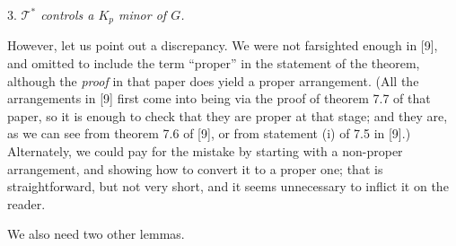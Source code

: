 \hspace*{12pt}3. \textit{$\mathcal{T}^*$ controls a $K_p$ minor of $G$.}

However, let us point out a discrepancy. We were not farsighted enough in [9], and omitted to include the term ``proper'' in the statement of the theorem, although the \textit{proof} in that paper does yield a proper arrangement. (All the arrangements in [9] first come into being via the proof of theorem 7.7 of that paper, so it is enough to check that they are proper at that stage; and they are, as we can see from theorem 7.6 of [9], or from statement (i) of 7.5 in [9].) Alternately, we could pay for the mistake by starting with a non-proper arrangement, and showing how to convert it to a proper one; that is straightforward, but not very short, and it seems unnecessary to inflict it on the reader.

We also need two other lemmas.
